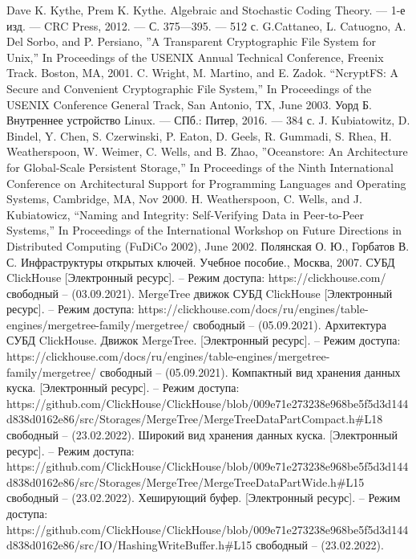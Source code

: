 \begin{thebibliography}{}
    Dave K. Kythe, Prem K. Kythe. Algebraic and Stochastic Coding Theory. — 1-е изд. — CRC Press, 2012. — С. 375—395. — 512 с.
    G.Cattaneo, L. Catuogno, A. Del Sorbo, and P. Persiano, ''A Transparent Cryptographic File System for Unix,'' In Proceedings of the USENIX Annual Technical Conference, Freenix Track. Boston, MA, 2001.
    C. Wright, M. Martino, and E. Zadok. “NcryptFS: A Secure and Convenient Cryptographic File System,” In Proceedings of the USENIX Conference General Track, San Antonio, TX, June 2003.
    Уорд Б. Внутреннее устройство Linux. — СПб.: Питер, 2016. — 384 с.
    J. Kubiatowitz, D. Bindel, Y. Chen, S. Czerwinski, P. Eaton, D. Geels, R. Gummadi, S. Rhea, H. Weatherspoon, W. Weimer, C. Wells, and B. Zhao, ''Oceanstore: An Architecture for Global-Scale Persistent Storage,'' In Proceedings of the Ninth International Conference on Architectural Support for Programming Languages and Operating Systems, Cambridge, MA, Nov 2000.
    H. Weatherspoon, C. Wells, and J. Kubiatowicz, “Naming and Integrity: Self-Verifying Data in Peer-to-Peer Systems,” In Proceedings of the International Workshop on Future Directions in Distributed Computing (FuDiCo 2002), June 2002.
    Полянская О. Ю., Горбатов В. С. Инфраструктуры открытых ключей. Учебное пособие., Москва, 2007.
    СУБД ClickHouse [Электронный ресурс]. – Режим доступа: https://clickhouse.com/ свободный – (03.09.2021).
    MergeTree движок СУБД ClickHouse [Электронный ресурс]. – Режим доступа: https://clickhouse.com/docs/ru/engines/table-engines/mergetree-family/mergetree/ свободный – (05.09.2021).
    Архитектура СУБД ClickHouse. Движок MergeTree. [Электронный ресурс]. – Режим доступа: https://clickhouse.com/docs/ru/engines/table-engines/mergetree-family/mergetree/ свободный – (05.09.2021).
    Компактный вид хранения данных куска. [Электронный ресурс]. – Режим доступа: https://github.com/ClickHouse/ClickHouse/blob/009e71e273238e968be5f5d3d144d838d0162e86/src/Storages/MergeTree/MergeTreeDataPartCompact.h#L18 свободный – (23.02.2022).
    Широкий вид хранения данных куска. [Электронный ресурс]. – Режим доступа: https://github.com/ClickHouse/ClickHouse/blob/009e71e273238e968be5f5d3d144d838d0162e86/src/Storages/MergeTree/MergeTreeDataPartWide.h#L15 свободный – (23.02.2022).
    Хеширующий буфер. [Электронный ресурс]. – Режим доступа: https://github.com/ClickHouse/ClickHouse/blob/009e71e273238e968be5f5d3d144d838d0162e86/src/IO/HashingWriteBuffer.h#L15 свободный – (23.02.2022).

\end{thebibliography}
